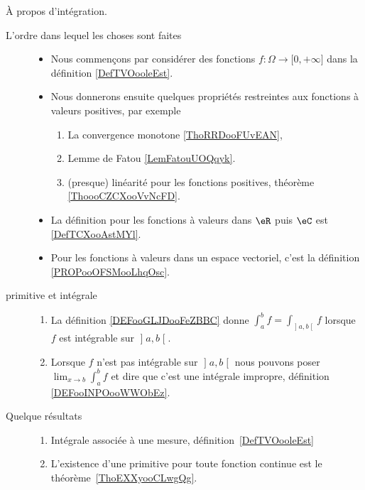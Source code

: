      \label{THEMEooHINHooJaSYQW}

À propos d'intégration.
\begin{description}

	\item[L'ordre dans lequel les choses sont faites]
		\begin{itemize}
			\item
			      Nous commençons par considérer des fonctions \( f\colon \Omega\to \mathopen[ 0 , +\infty \mathclose]\) dans la définition \ref{DefTVOooleEst}.
			\item
			      Nous donnerons ensuite quelques propriétés restreintes aux fonctions à valeurs positives, par exemple
			      \begin{enumerate}
				      \item
				            La convergence monotone \ref{ThoRRDooFUvEAN},
				      \item
				            Lemme de Fatou \ref{LemFatouUOQqyk}.
				      \item
				            (presque) linéarité pour les fonctions positives, théorème \ref{ThoooCZCXooVvNcFD}.
			      \end{enumerate}
			\item
			      La définition pour les fonctions à valeurs dans \( \eR\) puis \( \eC\) est \ref{DefTCXooAstMYl}.
			\item
			      Pour les fonctions à valeurs dans un espace vectoriel, c'est la définition \ref{PROPooOFSMooLhqOsc}.
		\end{itemize}
	\item[primitive et intégrale]
		\begin{enumerate}
			\item
			      La définition \ref{DEFooGLJDooFeZBBC} donne \( \int_a^bf=\int_{\mathopen] a ,b \mathclose[}f\) lorsque \( f\) est intégrable sur \( \mathopen] a , b \mathclose[\).
			\item Lorsque \( f\) n'est pas intégrable sur \( \mathopen] a , b \mathclose[\) nous pouvons poser \( \lim_{x\to b} \int_a^bf\) et dire que c'est une intégrale impropre, définition \ref{DEFooINPOooWWObEz}.
		\end{enumerate}
	\item[Quelque résultats]
		\begin{enumerate}
			\item
			      Intégrale associée à une mesure, définition~\ref{DefTVOooleEst}
			\item
			      L'existence d'une primitive pour toute fonction continue est le théorème~\ref{ThoEXXyooCLwgQg}.

\end{enumerate}
\end{description}
